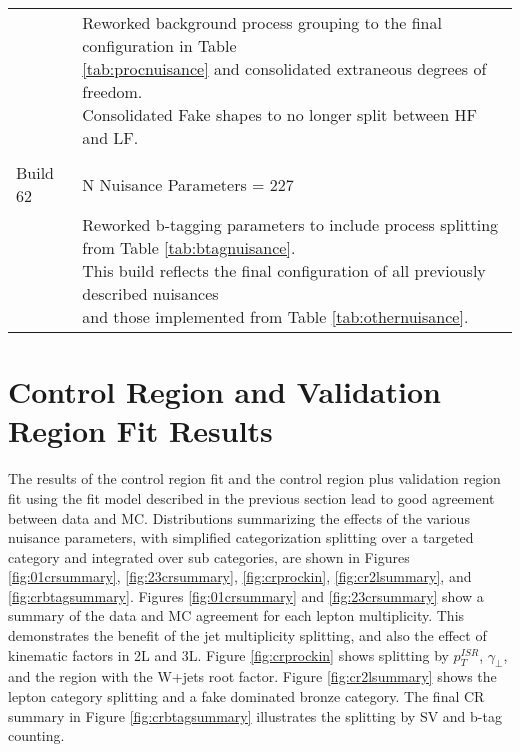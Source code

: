 \begin{table}
\begin{tabular}{ll}
\hline
 & \makecell[l]{Reworked background process grouping to the final configuration in Table \\ \ref{tab:procnuisance}  and consolidated extraneous degrees of freedom. \\Consolidated Fake shapes to no longer split between HF and LF. } \\
 & \\
\hline 
Build 62 & N Nuisance Parameters = 227 \\
\hline
 & \makecell[l]{Reworked b-tagging parameters to include process splitting from Table \ref{tab:btagnuisance}. \\ This build reflects the final configuration of all previously described nuisances \\ and those implemented from Table \ref{tab:othernuisance}. } \\
\end{tabular} 
\label{tab:builds}
\end{table}
\section{Control Region and Validation Region Fit Results}
The results of the control region fit and the control region plus validation region fit using the fit model described in the previous section lead to good agreement between data and MC. Distributions summarizing the effects of the various nuisance parameters, with simplified categorization splitting over a targeted category and integrated over sub categories, are shown in Figures \ref{fig:01crsummary}, \ref{fig:23crsummary}, \ref{fig:crprockin}, \ref{fig:cr2lsummary}, and \ref{fig:crbtagsummary}. Figures \ref{fig:01crsummary} and \ref{fig:23crsummary} show a summary of the data and MC agreement for each lepton multiplicity. This demonstrates the benefit of the jet multiplicity splitting, and also the effect of kinematic factors in 2L and 3L. Figure \ref{fig:crprockin} shows splitting by $p_T^{ISR}$, $\gamma_\perp$, and the region with the W+jets root factor. Figure \ref{fig:cr2lsummary} shows the lepton category splitting and a fake dominated bronze category. The final CR summary in Figure \ref{fig:crbtagsummary} illustrates the splitting by SV and b-tag counting.


